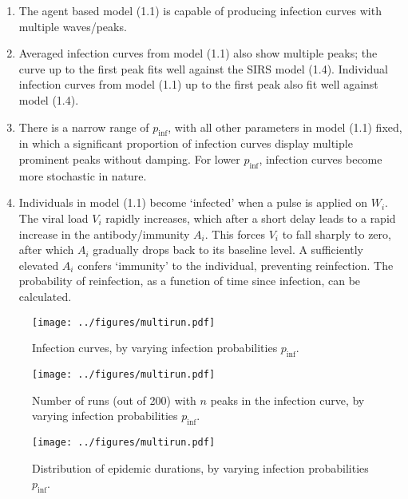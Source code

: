 \documentclass[11pt]{article}
\begin{document}
    \begin{enumerate}
        \item The agent based model (1.1) is capable of producing infection
        curves with multiple waves/peaks.

        \item Averaged infection curves from model (1.1) also show multiple
        peaks; the curve up to the first peak fits well against the SIRS model
        (1.4). Individual infection curves from model (1.1) up to the first
        peak also fit well against model (1.4).

        \item There is a narrow range of $p_\text{inf}$, with all other
        parameters in model (1.1) fixed, in which a significant proportion of
        infection curves display multiple prominent peaks without damping. For
        lower $p_\text{inf}$, infection curves become more stochastic in
        nature.

        \item Individuals in model (1.1) become `infected' when a pulse is
        applied on $W_i$. The viral load $V_i$ rapidly increases, which after
        a short delay leads to a rapid increase in the antibody/immunity
        $A_i$. This forces $V_i$ to fall sharply to zero, after which $A_i$
        gradually drops back to its baseline level. A sufficiently elevated
        $A_i$ confers `immunity' to the individual, preventing reinfection.
        The probability of reinfection, as a function of time since infection,
        can be calculated.
    \end{enumerate}


    \begin{figure}[h!]
    \begin{center}
        \texttt{[image: ../figures/multirun.pdf]}
    \end{center}
    \caption{Infection curves, by varying infection probabilities
    $p_\text{inf}$.}
    \label{fig:multiruns}
    \end{figure}


    \begin{figure}[h!]
    \begin{center}
        \texttt{[image: ../figures/multirun.pdf]}
    \end{center}
    \caption{Number of runs (out of 200) with $n$ peaks in the infection
    curve, by varying infection probabilities $p_\text{inf}$.}
    \label{fig:peaks}
    \end{figure}

    \begin{figure}[h!]
    \begin{center}
        \texttt{[image: ../figures/multirun.pdf]}
    \end{center}
    \caption{Distribution of epidemic durations, by varying infection
    probabilities $p_\text{inf}$.}
    \label{fig:durations}
    \end{figure}
\end{document}
